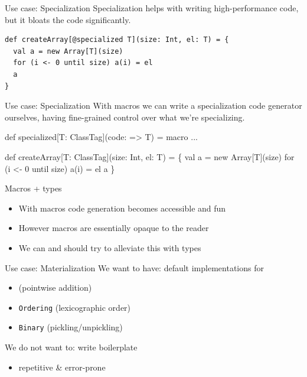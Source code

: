 \documentclass{beamer}
\begin{document}
\begin{frame}[fragile]{Use case: Specialization}
  Specialization helps with writing high-performance code,
  but it bloats the code significantly.

  \vspace{1em}
  \begin{verbatim}
def createArray[@specialized T](size: Int, el: T) = {
  val a = new Array[T](size)
  for (i <- 0 until size) a(i) = el
  a
}
  \end{verbatim}
\end{frame}

\begin{frame}[fragile]{Use case: Specialization}
  With macros we can write a specialization code generator ourselves,
  having fine-grained control over what we're specializing.

  \vspace{1em}
  \begin{semiverbatim}
def specialized[T: ClassTag](code: => T) = macro ...

def createArray[T: ClassTag](size: Int, el: T) = \{
  val a = new Array[T](size)
    for (i <- 0 until size) a(i) = el
  \text{\color{blue}{\}}}
  a
\}
  \end{semiverbatim}
\end{frame}

\begin{frame}{Macros + types}
  \begin{itemize}
  \item With macros code generation becomes accessible and fun
  \item However macros are essentially opaque to the reader
  \item We can and should try to alleviate this with types
  \end{itemize}
\end{frame}

\begin{frame}{Use case: Materialization}
  We want to have: default implementations for
  \begin{itemize}
    \item \texttt{\color{red}{Semigroup}} (pointwise addition)
    \item \texttt{Ordering} (lexicographic order)
    \item \texttt{Binary} (pickling/unpickling)
  \end{itemize}

  \vspace{1em}
  We do not want to: write boilerplate
  \begin{itemize}
    \item repetitive \& error-prone
  \end{itemize}
\end{frame}
\end{document}
